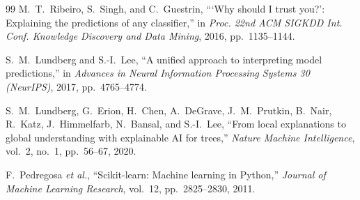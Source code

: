 \documentclass[conference]{IEEEtran}
\begin{document}
\begin{thebibliography}{99}
M.~T.~Ribeiro, S.~Singh, and C.~Guestrin, ```Why should I trust you?': Explaining the predictions of any classifier,'' in \emph{Proc. 22nd ACM SIGKDD Int. Conf. Knowledge Discovery and Data Mining}, 2016, pp.~1135--1144.

S.~M.~Lundberg and S.-I.~Lee, ``A unified approach to interpreting model predictions,'' in \emph{Advances in Neural Information Processing Systems 30 (NeurIPS)}, 2017, pp.~4765--4774.

S.~M.~Lundberg, G.~Erion, H.~Chen, A.~DeGrave, J.~M.~Prutkin, B.~Nair, R.~Katz, J.~Himmelfarb, N.~Bansal, and S.-I.~Lee, ``From local explanations to global understanding with explainable AI for trees,'' \emph{Nature Machine Intelligence}, vol.~2, no.~1, pp.~56--67, 2020.

F.~Pedregosa \emph{et al.}, ``Scikit-learn: Machine learning in Python,'' \emph{Journal of Machine Learning Research}, vol.~12, pp.~2825--2830, 2011.
\end{thebibliography}
\end{document}
